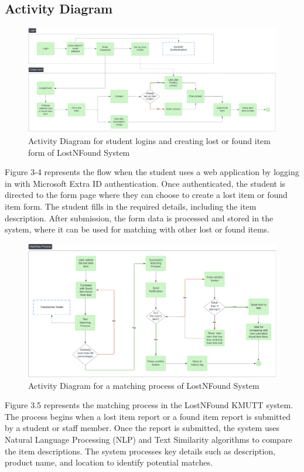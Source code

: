 \newpage
\subsection{Activity Diagram}
\begin{figure}[!h]
    \centering
    \includegraphics[width=1\linewidth]{chapter3/activity-diagram.png}
    \caption{Activity Diagram for student logins and creating lost or found item form of LostNFound System}
    \label{fig:Activity Diagram for student logins and creating lost or found item form of LostNFound System}
\end{figure}
\par
Figure 3-4 represents the flow when the student uses a web application by logging in with Microsoft Extra ID authentication. Once authenticated, the student is directed to the form page where they can choose to create a lost item or found item form. The student fills in the required details, including the item description. After submission, the form data is processed and stored in the system, where it can be used for matching with other lost or found items.

\newpage
\begin{figure}[!h]
    \centering
    \includegraphics[width=1\linewidth]{chapter3/activity-diagram2.png}
    \caption{Activity Diagram for a matching process of LostNFound System}
    \label{fig:Activity Diagram for a matching process of LostNFound System}
\end{figure}
\par
Figure 3.5 represents the matching process in the LostNFound KMUTT system. The process begins when a lost item report or a found item report is submitted by a student or staff member. Once the report is submitted, the system uses Natural Language Processing (NLP) and Text Similarity algorithms to compare the item descriptions. The system processes key details such as description, product name, and location to identify potential matches.

